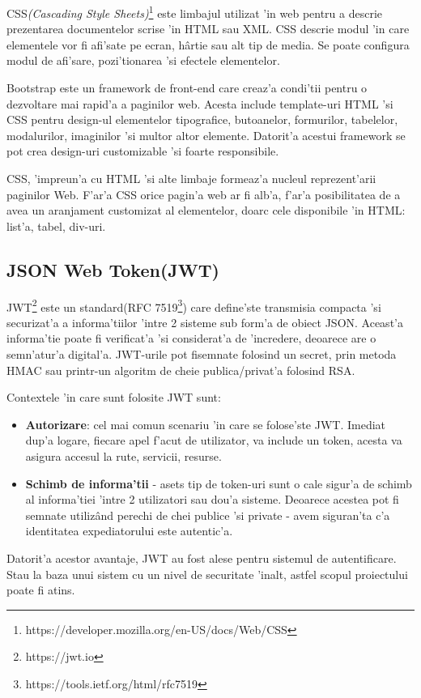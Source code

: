 \documentclass[12pt,a4paper,twoside]{report}
\begin{document}
CSS\textit{(Cascading Style Sheets)}\footnote{https://developer.mozilla.org/en-US/docs/Web/CSS} este limbajul utilizat 'in web pentru a descrie prezentarea documentelor scrise 'in HTML sau XML. CSS descrie modul  'in care elementele vor fi afi'sate pe ecran, hârtie sau alt tip de media. Se poate configura modul de afi'sare, pozi'tionarea 'si efectele elementelor.

Bootstrap este un framework de front-end care creaz'a condi'tii pentru o dezvoltare mai rapid'a a paginilor web. Acesta include template-uri HTML 'si CSS pentru design-ul elementelor tipografice, butoanelor, formurilor, tabelelor, modalurilor, imaginilor 'si multor altor elemente. Datorit'a acestui framework se pot crea design-uri customizable 'si foarte responsibile.

CSS, 'impreun'a cu HTML 'si alte limbaje formeaz'a nucleul reprezent'arii paginilor Web. F'ar'a CSS orice pagin'a web ar  fi alb'a, f'ar'a posibilitatea de a avea un aranjament customizat al elementelor, doarc cele disponibile 'in HTML: list'a, tabel, div-uri. 

\subsection{JSON Web Token(JWT)}
JWT\footnote{https://jwt.io} este un standard(RFC 7519\footnote{https://tools.ietf.org/html/rfc7519}) care define'ste transmisia compacta 'si securizat'a a informa'tiilor 'intre 2 sisteme sub form'a de obiect JSON. Aceast'a informa'tie poate fi verificat'a 'si considerat'a de 'incredere, deoarece are o semn'atur'a digital'a. JWT-urile pot fisemnate folosind un secret, prin metoda HMAC sau printr-un algoritm de cheie publica/privat'a folosind RSA.

Contextele 'in care sunt folosite JWT sunt:
\begin{itemize}
\item{\textbf{Autorizare}: cel mai comun scenariu 'in care se folose'ste JWT. Imediat dup'a logare, fiecare apel f'acut de utilizator, va include un token, acesta va asigura accesul la rute, servicii, resurse. }
\item{\textbf{Schimb de informa'tii} - asets tip de token-uri sunt o cale sigur'a de schimb al informa'tiei 'intre 2 utilizatori sau dou'a sisteme. Deoarece acestea pot fi semnate utilizând perechi de chei publice 'si private - avem siguran'ta c'a identitatea expediatorului este autentic'a.}
\end{itemize}
 Datorit'a acestor avantaje, JWT au fost alese pentru sistemul de autentificare. Stau la baza unui sistem cu un nivel de securitate 'inalt, astfel scopul proiectului poate fi atins.
 
\end{document}
